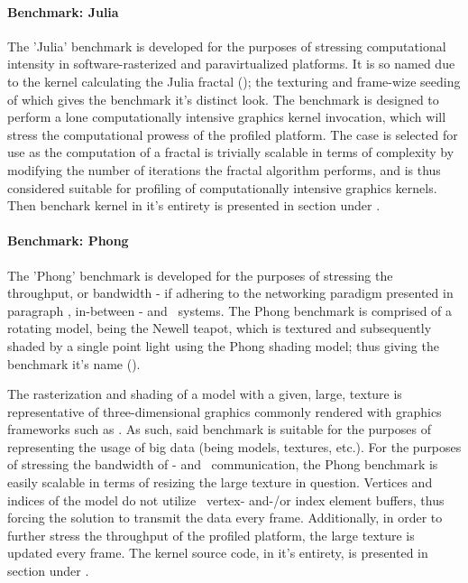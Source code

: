 \paragraph{Benchmark: Julia}
\label{par:methodologyexperiment_benchmarking_benchmarkjulia}
The 'Julia' benchmark is developed for the purposes of stressing computational intensity in software-rasterized and paravirtualized platforms.
It is so named due to the kernel calculating the Julia fractal (); the texturing and frame-wize seeding of which gives the benchmark it's distinct look.
The benchmark is designed to perform a lone computationally intensive graphics kernel invocation, which will stress the computational prowess of the profiled platform.
The case is selected for use as the computation of a fractal is trivially scalable in terms of complexity by modifying the number of iterations the fractal algorithm performs, and is thus considered suitable for profiling of computationally intensive graphics kernels.
Then benchark kernel in it's entirety is presented in section
 under .

\paragraph{Benchmark: Phong}
\label{par:methodologyexperiment_benchmarking_benchmarkphong}
The 'Phong' benchmark is developed for the purposes of stressing the throughput, or bandwidth - if adhering to the networking paradigm presented in paragraph , in-between \dvttermtarget - and \dvttermhost\ systems.
The Phong benchmark is comprised of a rotating model, being the Newell teapot, which is textured and subsequently shaded by a single point light using the Phong shading model; thus giving the benchmark it's name ().

The rasterization and shading of a model with a given, large, texture is representative of three-dimensional graphics commonly rendered with graphics frameworks such as \dvttermopenglestwopointo .
As such, said benchmark is suitable for the purposes of representing the usage of big data (being models, textures, etc.).
For the purposes of stressing the bandwidth of \dvttermtarget - and \dvttermhost\ communication, the Phong benchmark is easily scalable in terms of resizing the large texture in question.
Vertices and indices of the model do not utilize \dvttermopengl\ vertex- and-/or index element buffers, thus forcing the solution to transmit the data every frame.
Additionally, in order to further stress the throughput of the profiled platform, the large texture is updated every frame.
The kernel source code, in it's entirety, is presented in section  under .


